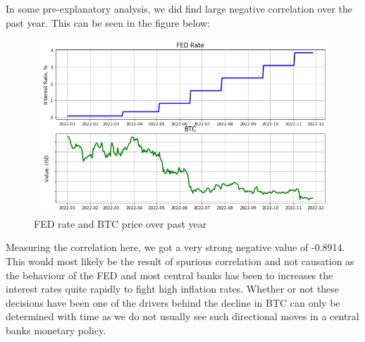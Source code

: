 \documentclass[12pt]{article}
\begin{document}
In some pre-explanatory analysis, we did find large negative correlation over the past year. This can be seen in the figure below:
\begin{figure}[H]
   \includegraphics[scale=0.6]{research_project/text/paper/image2.png}
   \centering
   \caption{FED rate and BTC price over past year}
   \label{fig:comp_lastyear}
\end{figure}
\newline
Measuring the correlation here, we got a very strong negative value of -0.8914. This would most likely be the result of spurious correlation and not causation as the behaviour of the FED and most central banks has been to increases the interest rates quite rapidly to fight high inflation rates. Whether or not these decisions have been one of the drivers behind the decline in BTC can only be determined with time as we do not usually see such directional moves in a central banks monetary policy. 
\end{document}
